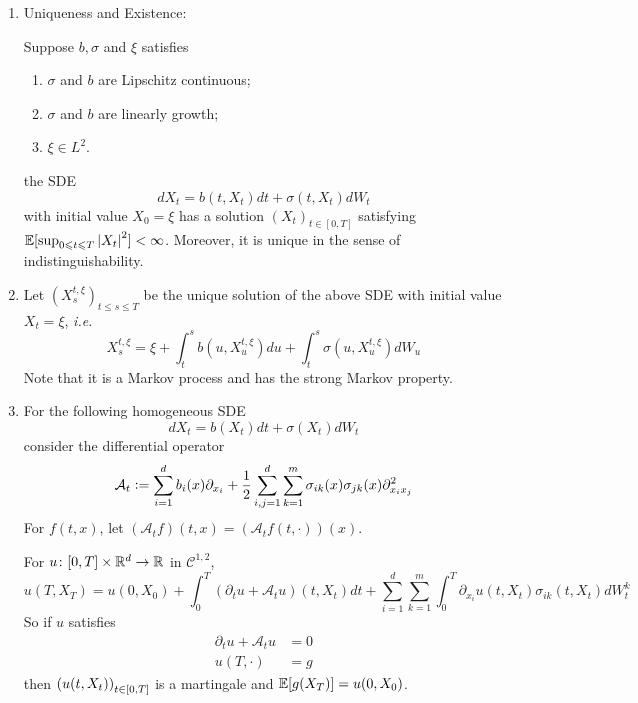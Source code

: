 \documentclass[a4paper,12pt]{article}
\begin{document}
\begin{enumerate}[label=\arabic*.]
  \item Uniqueness and Existence:
  \begin{thm}
    Suppose $b,\sigma$ and $\xi$ satisfies
    \begin{enumerate}[label=(\arabic*)]
      \item $\sigma$ and $b$ are Lipschitz continuous;
      \item $\sigma$ and $b$ are linearly growth;
      \item $\xi \in L^2$.
    \end{enumerate}
    the SDE
    \begin{equation*}
      dX_t = b(t,X_t)dt + \sigma(t,X_t)dW_t
    \end{equation*}
    with initial value $X_0 = \xi$ has a solution $(X_t)_{t \in [0,T]}$ satisfying $\mathbb{E}[\sup_{0\leqslant t \leqslant T}\left\lvert X_t\right\lvert^2] < \infty$. Moreover, it is unique in the sense of indistinguishability.
  \end{thm}

  \item Let $(X^{t,\xi}_s)_{t\leqslant s \leqslant T}$ be the unique solution of the above SDE with initial value $X_t = \xi$, \emph{i.e.}
  \begin{equation*}
    X^{t,\xi}_s = \xi + \int_t^s b(u,X^{t,\xi}_u)du + \int_t^s\sigma(u,X^{t,\xi}_u)dW_u
  \end{equation*}
  Note that it is a Markov process and has the strong Markov property. 

  \item For the following homogeneous SDE
  \begin{equation*}
    dX_t = b(X_t)dt + \sigma(X_t)dW_t
  \end{equation*}
  consider the differential operator
  \begin{equation*}
    \mathcal{A}_t \vcentcolon= \sum_{i=1}^d b_i(x)\partial_{x_i} + \frac{1}{2}\sum_{i,j=1}^d\sum_{k=1}^m\sigma_{ik}(x)\sigma_{jk}(x)\partial^2_{x_ix_j}
  \end{equation*}
  For $f(t,x)$, let $(\mathcal{A}_tf)(t,x) = (\mathcal{A}_tf(t,\cdot))(x)$.

  \noindent For $u \colon [0,T]\times \mathbb{R}^d \rightarrow \mathbb{R}$ in $\mathcal{C}^{1,2}$,
  \begin{equation*}
    u(T,X_T) = u(0,X_0) + \int_0^T (\partial_tu+\mathcal{A}_tu)(t,X_t)dt+ \sum_{i=1}^d\sum_{k=1}^m\int_0^T\partial_{x_i}u(t,X_t)\sigma_{ik}(t,X_t)dW^k_t
  \end{equation*}
  So if $u$ satisfies
  \begin{equation*}
    \begin{split}
      \partial_tu+\mathcal{A}_tu &= 0 \\
      u(T,\cdot) &=g
    \end{split}\tag{$*_1$}
  \end{equation*}
  then $\left(u(t,X_t)\right)_{t\in [0,T]}$ is a martingale and $\mathbb{E}[g(X_T)] = u(0,X_0)$.


\end{enumerate}
\end{document}
